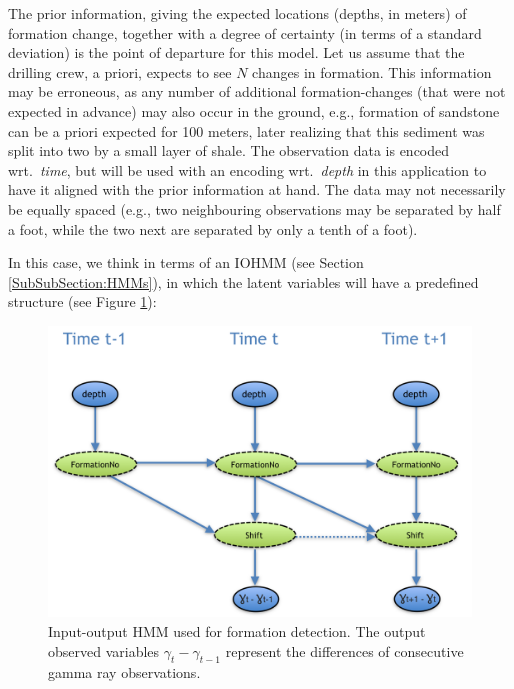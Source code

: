 The prior information, giving the expected locations (depths, in meters) of formation change, together with a degree of certainty (in terms of a standard deviation) is the point of departure for this model. Let us assume that the drilling crew, a priori, expects  to see $N$ changes in formation. 
This information may be erroneous, as any number of additional formation-changes (that were not expected in advance) may also occur in the ground, e.g., formation of sandstone can be a priori expected for 100 meters, later realizing that this sediment was split into two by a small layer of shale.
The observation data is encoded wrt.\ \textit{time}, but will be used with an encoding wrt.\ \textit{depth} in this application to have it aligned with the prior information at hand. The data may not necessarily be equally spaced (e.g., two neighbouring observations may be separated by half a foot, while the two next are separated by only a tenth of a foot). 
 
In this case, we think in terms of an IOHMM (see Section \ref{SubSubSection:HMMs}), in which the latent variables will have a predefined structure (see Figure \ref{Figure:VTScenario3}):

\begin{figure}[ht!]
\begin{center}
\includegraphics[scale=0.5]{./figures/VT_Scenario3} 
\caption{\label{Figure:VTScenario3} Input-output HMM used for formation detection. The output observed variables $\gamma_t-\gamma_{t-1}$ represent the differences of consecutive gamma ray observations.}
\end{center}
\end{figure}

